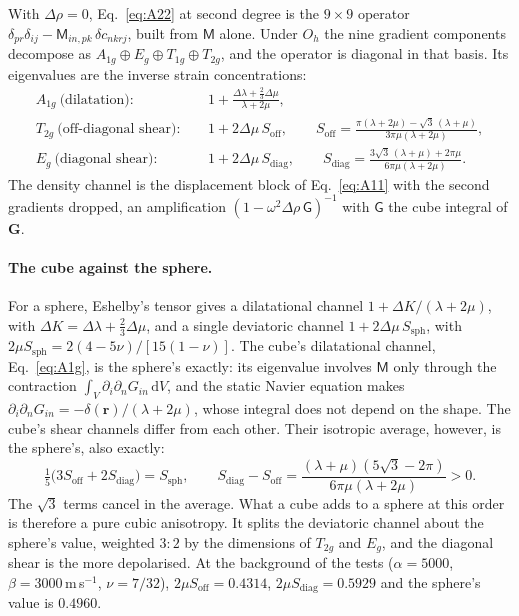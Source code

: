 \documentclass[11pt,a4paper]{article}
\newcommand{\bG}{\mathbf{G}}
\newcommand{\dd}{\mathrm{d}}
\begin{document}
With $\Delta\rho=0$, Eq.~\eqref{eq:A22} at second degree is the $9\times9$ operator
$\delta_{pr}\delta_{ij}-\mathsf M_{in,pk}\,\delta c_{nkrj}$, built from $\mathsf M$ alone. Under
$O_h$ the nine gradient components decompose as $A_{1g}\oplus E_g\oplus T_{1g}\oplus T_{2g}$, and
the operator is diagonal in that basis. Its eigenvalues are the inverse strain concentrations:
\begin{align}
A_{1g}\ \text{(dilatation)}:&\quad 1+\frac{\Delta\lambda+\tfrac23\Delta\mu}{\lambda+2\mu},
  \label{eq:A1g}\\
T_{2g}\ \text{(off-diagonal shear)}:&\quad 1+2\Delta\mu\,S_{\text{off}},\qquad
  S_{\text{off}}=\frac{\pi(\lambda+2\mu)-\sqrt3\,(\lambda+\mu)}{3\pi\mu(\lambda+2\mu)},
  \label{eq:T2g}\\
E_{g}\ \text{(diagonal shear)}:&\quad 1+2\Delta\mu\,S_{\text{diag}},\qquad
  S_{\text{diag}}=\frac{3\sqrt3\,(\lambda+\mu)+2\pi\mu}{6\pi\mu(\lambda+2\mu)}.
  \label{eq:Eg}
\end{align}
The density channel is the displacement block of Eq.~\eqref{eq:A11} with the second gradients
dropped, an amplification $(1-\omega^2\Delta\rho\,\mathsf G)^{-1}$ with $\mathsf G$ the cube
integral of $\bG$.

\paragraph{The cube against the sphere.} For a sphere, Eshelby's tensor gives a dilatational
channel $1+\Delta K/(\lambda+2\mu)$, with $\Delta K=\Delta\lambda+\tfrac23\Delta\mu$, and a single
deviatoric channel $1+2\Delta\mu\,S_{\text{sph}}$, with $2\mu S_{\text{sph}}=2(4-5\nu)/[15(1-\nu)]$.
The cube's dilatational channel, Eq.~\eqref{eq:A1g}, is the sphere's exactly: its eigenvalue
involves $\mathsf M$ only through the contraction $\int_V\partial_i\partial_nG_{in}\,\dd V$, and the
static Navier equation makes $\partial_i\partial_nG_{in}=-\delta(\mathbf r)/(\lambda+2\mu)$, whose
integral does not depend on the shape. The
cube's shear channels differ from each other. Their isotropic average, however, is the sphere's,
also exactly:
\begin{equation}\label{eq:shearsplit}
  \tfrac15\bigl(3S_{\text{off}}+2S_{\text{diag}}\bigr)=S_{\text{sph}},\qquad
  S_{\text{diag}}-S_{\text{off}}=\frac{(\lambda+\mu)(5\sqrt3-2\pi)}{6\pi\mu(\lambda+2\mu)}>0 .
\end{equation}
The $\sqrt3$ terms cancel in the average. What a cube adds to a sphere at this order is therefore
a pure cubic anisotropy. It splits the deviatoric channel about the sphere's value, weighted $3:2$
by the dimensions of $T_{2g}$ and $E_g$, and the diagonal shear is the more depolarised. At the background of the tests
($\alpha=5000$, $\beta=3000$\,m\,s$^{-1}$, $\nu=7/32$), $2\mu S_{\text{off}}=0.4314$, $2\mu S_{\text{diag}}=0.5929$
and the sphere's value is $0.4960$.
\end{document}
